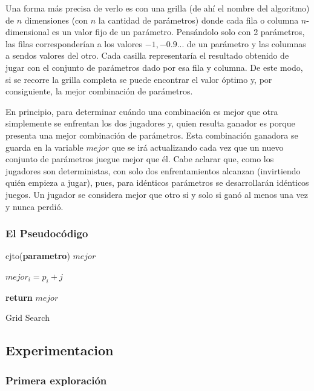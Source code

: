 \documentclass[A4paper,oneside,fleqn,11pt]{article}
\theoremstyle{definition}
\begin{document}
Una forma más precisa de verlo es con una grilla (de ahí el nombre del algoritmo) de $n$ dimensiones (con $n$ la cantidad de parámetros) donde cada fila o columna $n$-dimensional es un valor fijo de un parámetro. Pensándolo solo con 2 parámetros, las filas corresponderían a los valores $-1, -0.9...$ de un parámetro y las columnas a sendos valores del otro. Cada casilla representaría el resultado obtenido de jugar con el conjunto de parámetros dado por esa fila y columna. De este modo, si se recorre la grilla completa se puede encontrar el valor óptimo y, por consiguiente, la mejor combinación de parámetros.

En principio, para determinar cuándo una combinación es mejor que otra simplemente se enfrentan los dos jugadores y, quien resulta ganador es porque presenta una mejor combinación de parámetros. Esta combinación ganadora se guarda en la variable $mejor$ que se irá actualizando cada vez que un nuevo conjunto de parámetros juegue mejor que él. Cabe aclarar que, como los jugadores son deterministas, con solo dos enfrentamientos alcanzan (invirtiendo quién empieza a jugar), pues, para idénticos parámetros se desarrollarán idénticos juegos. Un jugador se considera mejor que otro si y solo si ganó al menos una vez y nunca perdió.
 
\subsubsection{El Pseudocódigo}

\begin{algorithm}



cjto(\textbf{parametro}) $mejor$

	{
		{	
			{		
			$mejor_i = p_i +j$		
			}
		}
	}

\textbf{return} $mejor$

\caption{Grid Search}
\end{algorithm}

\subsection{Experimentacion}

\subsubsection{Primera exploración}
\end{document}

